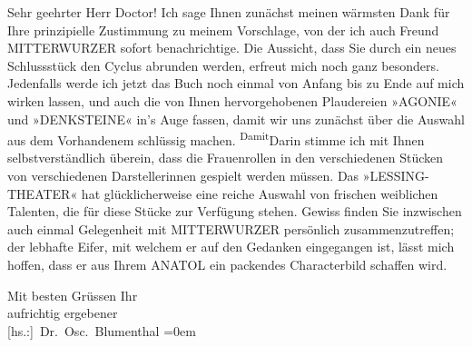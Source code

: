 \pstart\center{}Sehr geehrter Herr Doctor!\pend\vspace{0.5em}
\pstart
           Ich sage Ihnen zunächst meinen wärmsten Dank für Ihre prinzipielle Zustimmung zu
               meinem Vorschlage, von der ich auch Freund MITTERWURZER sofort benachrichtige. Die Aussicht, dass Sie durch ein neues Schlussstück den
                  Cyclus abrunden werden,
               erfreut mich noch ganz besonders. Jedenfalls werde ich jetzt das Buch noch einmal von
               Anfang bis zu Ende auf mich wirken lassen, und auch die von Ihnen hervorgehobenen
               Plaudereien »AGONIE« und »DENKSTEINE« in’s Auge fassen, damit wir uns zunächst über die Auswahl aus dem Vorhandenem
               schlüssig machen. \substVorne{}\textsuperscript{Damit}\substDazwischen{}Darin\substHinten{} stimme ich mit Ihnen selbstverständlich überein, dass die Frauenrollen in
               den verschiedenen Stücken von verschiedenen Darstellerinnen gespielt werden müssen.
               Das »LESSING-THEATER« hat glücklicherweise eine reiche Auswahl {\pb}von frischen weiblichen Talenten, die für
               diese Stücke zur Verfügung stehen. Gewiss finden Sie inzwischen auch einmal
               Gelegenheit mit MITTERWURZER persönlich zusammenzutreffen; der lebhafte Eifer, mit welchem er auf den
               Gedanken eingegangen ist, lässt mich hoffen, dass er aus Ihrem ANATOL ein packendes Characterbild schaffen wird.\pend
           
\pstart
           Mit besten Grüssen Ihr{\\[\baselineskip]} aufrichtig ergebener{\\[\baselineskip]}\spacefill\mbox{{[}hs.:{]} Dr. Osc. Blumenthal}\pend
           \leftskip=0em{}\endnumbering{}  \newcommand{\dateiname}{L00623}\newcommand{\titel}{Oscar Blumenthal an Arthur Schnitzler, 19. 11. 1896}\newcommand{\editorInnen}{Martin Anton Müller und Gerd-Hermann Susen}
